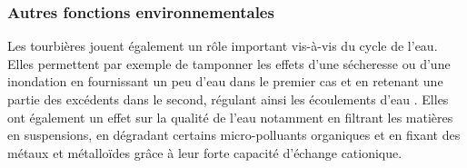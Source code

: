 

\subsubsection{Autres fonctions environnementales}

Les tourbières jouent également un rôle important vis-à-vis du cycle de l'eau.
Elles permettent par exemple de tamponner les effets d'une sécheresse ou d'une inondation en fournissant un peu d'eau dans le premier cas et en retenant une partie des excédents dans le second, régulant ainsi les écoulements d'eau \citep{joosten2002,parish2008}.
Elles ont également un effet sur la qualité de l'eau notamment en filtrant les matières en suspensions, en dégradant certains micro-polluants organiques et en fixant des métaux et métalloïdes grâce à leur forte capacité d'échange cationique.


